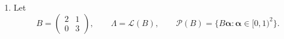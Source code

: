 %	
%	
%	
%	
%	
%	
%	
%	
%	

\begin{enumerate}
	\item[\textbf{21-24}] Let
	\[
	B=
	\begin{pmatrix}
		2&1\\
		0&3
	\end{pmatrix},
	\qquad
	\Lambda=\mathcal L(B),
	\qquad
	\mathcal P(B)=\{B\boldsymbol\alpha:\boldsymbol\alpha\in[0,1)^2\}.
	\]
\end{enumerate}

